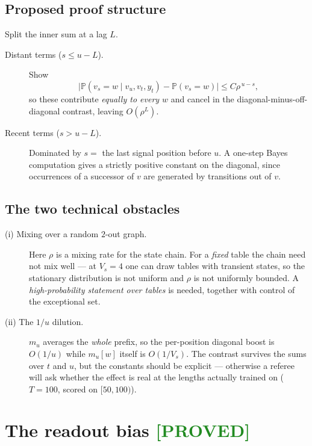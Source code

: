 \documentclass[11pt,a4paper]{article}
\theoremstyle{plain}
\theoremstyle{definition}
\newcommand{\PROVED}{\textcolor{ForestGreen}{\textbf{[PROVED]}}}
\newcommand{\1}{\mathbf{1}}
\newcommand{\PP}{\mathbb{P}}
\begin{document}
\subsection{Proposed proof structure}

Split the inner sum at a lag $L$.

\begin{description}
\item[Distant terms ($s\le u-L$).] Show
\begin{equation}
\bigl|\PP(v_s{=}w\mid v_u,v_t,y_t)-\PP(v_s{=}w)\bigr|\le C\rho^{\,u-s},
\end{equation}
so these contribute \emph{equally to every $w$} and cancel in the diagonal-minus-off-diagonal
contrast, leaving $O(\rho^L)$.
\item[Recent terms ($s>u-L$).] Dominated by $s=$ the last signal position before $u$. A one-step
Bayes computation gives a strictly positive constant on the diagonal, since occurrences of a
successor of $v$ are generated by transitions out of $v$.
\end{description}

\subsection{The two technical obstacles}

\begin{description}
\item[(i) Mixing over a random $2$-out graph.] Here $\rho$ is a mixing rate for the state chain.
For a \emph{fixed} table the chain need not mix well --- at $V_s=4$ one can draw tables with
transient states, so the stationary distribution is not uniform and $\rho$ is not uniformly
bounded. A \emph{high-probability statement over tables} is needed, together with control of the
exceptional set.
\item[(ii) The $1/u$ dilution.] $m_u$ averages the \emph{whole} prefix, so the per-position
diagonal boost is $O(1/u)$ while $m_u[w]$ itself is $O(1/V_s)$. The contrast survives the sums
over $t$ and $u$, but the constants should be explicit --- otherwise a referee will ask whether
the effect is real at the lengths actually trained on ($T=100$, scored on $[50,100)$).
\end{description}

\section{The readout bias \quad \PROVED}\label{sec:bias}
\end{document}
